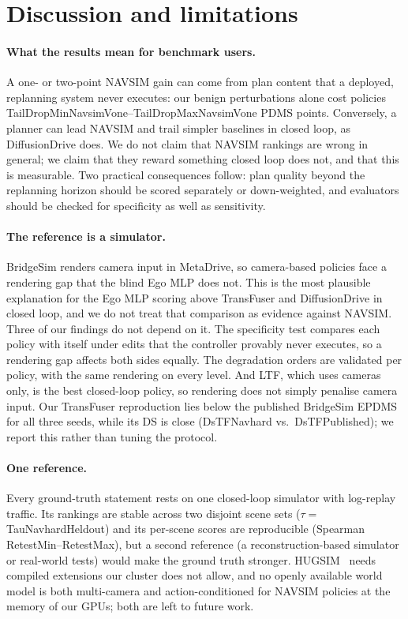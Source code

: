 \section{Discussion and limitations}
\label{sec:discussion}

\paragraph{What the results mean for benchmark users.}
A one- or two-point NAVSIM gain can come from plan content that a deployed, replanning system never
executes: our benign perturbations alone cost policies \num{TailDropMinNavsimVone}--\num{TailDropMaxNavsimVone}
PDMS points.
Conversely, a planner can lead NAVSIM and trail simpler baselines in closed loop, as DiffusionDrive
does.
We do not claim that NAVSIM rankings are wrong in general; we claim that they reward something closed
loop does not, and that this is measurable.
Two practical consequences follow: plan quality beyond the replanning horizon should be scored
separately or down-weighted, and evaluators should be checked for specificity as well as sensitivity.

\paragraph{The reference is a simulator.}
BridgeSim renders camera input in MetaDrive, so camera-based policies face a rendering gap that the
blind Ego MLP does not.
This is the most plausible explanation for the Ego MLP scoring above TransFuser and DiffusionDrive in
closed loop, and we do not treat that comparison as evidence against NAVSIM.
Three of our findings do not depend on it.
The specificity test compares each policy with itself under edits that the controller provably never
executes, so a rendering gap affects both sides equally.
The degradation orders are validated per policy, with the same rendering on every level.
And LTF, which uses cameras only, is the best closed-loop policy, so rendering does not simply penalise
camera input.
Our TransFuser reproduction lies below the published BridgeSim EPDMS for all three seeds, while its DS
is close (\num{DsTFNavhard} vs.\ \num{DsTFPublished}); we report this rather than tuning the protocol.

\paragraph{One reference.}
Every ground-truth statement rests on one closed-loop simulator with log-replay traffic.
Its rankings are stable across two disjoint scene sets ($\tau={}$\num{TauNavhardHeldout}) and its
per-scene scores are reproducible (Spearman \num{RetestMin}--\num{RetestMax}), but a second reference
(a reconstruction-based simulator or real-world tests) would make the ground truth stronger.
HUGSIM~\cite{zhou2024hugsim} needs compiled extensions our cluster does not allow, and no openly
available world model is both multi-camera and action-conditioned for NAVSIM policies at the memory of
our GPUs; both are left to future work.

